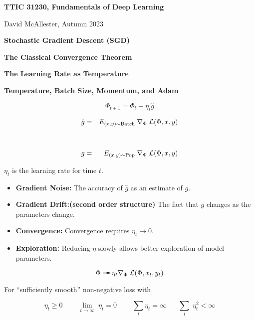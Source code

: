 


\newcommand{\solution}[1]{\bigskip {\bf Solution}: #1}



{\Huge
  \centerline{\bf TTIC 31230, Fundamentals of Deep Learning}
  \bigskip
  \centerline{David McAllester, Autumn 2023}
  \vfill
  \centerline{\bf Stochastic Gradient Descent (SGD)}
  \vfill
  \vfill
  \centerline{\bf The Classical Convergence Theorem}
  \vfill
  \centerline{\bf The Learning Rate as Temperature}
  \vfill
  \centerline{\bf Temperature, Batch Size, Momentum, and Adam}


$$\Phi_{t+1} = \Phi_t - \eta_t \hat{g}$$

\vfill
\begin{eqnarray*}
  \hat{g} & = & E_{(x,y) \sim \mathrm{Batch}}\;\nabla_\Phi\;{\cal L}(\Phi,x,y) \\
  \\
  \\
  g & = & E_{(x,y) \sim \mathrm{Pop}}\;\nabla_\Phi\;{\cal L}(\Phi,x,y) \\
\end{eqnarray*}

\vfill
\centerline{$\eta_t$ is the learning rate for time $t$.}



\vfill
\begin{itemize}
\item {\bf Gradient Noise:} The accuracy of $\hat{g}$ as an estimate of $g$.

  \vfill
\item {\bf Gradient Drift:(second order structure)} The fact that $g$ changes as the parameters change.

  \vfill
\item {\bf Convergence:} Convergence requires $\eta_t \rightarrow 0$.

  \vfill
  \item {\bf Exploration:} Reducing $\eta$ slowly allows better exploration of model parameters.
\end{itemize}


$$\Phi \;\mbox{\tt -=} \; \eta_t \nabla_\Phi\;{\cal L}(\Phi,x_t,y_t)$$

\vfill
For ``sufficiently smooth'' non-negative loss with

\vfill
$$\eta_t \geq 0\;\;\;\;\;\;\;\;\lim_{t \rightarrow \infty} \;\eta_t = 0\;\;\;\;\;\;\;\;\sum_t \eta_t = \infty \;\;\;\;\;\;\sum_t \;\eta_t^2 < \infty$$

}
